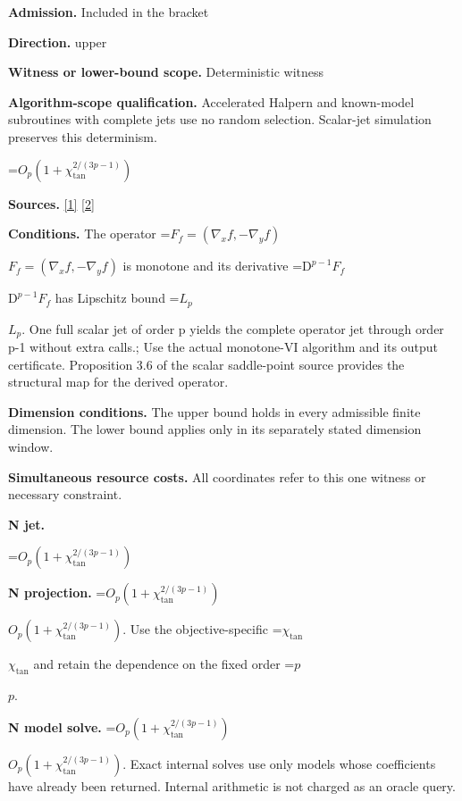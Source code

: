 \documentclass[10pt,a4paper]{article}
\newcommand{\AtlasMath}[1]{\par\begingroup\centering\setbox0=\hbox{$\displaystyle #1$}\ifdim\wd0>1.4\linewidth\typeout{ATLAS WIDE FORMULA: \the\wd0}\fi\ifdim\wd0>\linewidth\resizebox{\linewidth}{!}{\box0}\else\box0\fi\par\endgroup}
\newcommand{\AtlasInlineMath}[1]{\begingroup\setbox0=\hbox{$#1$}\ifdim\wd0>.4\linewidth\endgroup\AtlasMath{#1}\else\endgroup$#1$\fi}
\begin{document}
\textbf{Admission.} Included in the bracket



\textbf{Direction.} upper



\textbf{Witness or lower-bound scope.} Deterministic witness



\textbf{Algorithm-scope qualification.} Accelerated Halpern and known-model subroutines with complete jets use no random selection. Scalar-jet simulation preserves this determinism.



\AtlasMath{O_p(1+\chi_{\mathrm{tan}}^{2/(3p-1)})}


\textbf{Sources.} \href{https://arxiv.org/pdf/2609.23557v1}{[1]} \href{https://arxiv.org/pdf/2609.28246v2}{[2]}



\textbf{Conditions.} The operator \AtlasInlineMath{F_f=(\nabla_xf,-\nabla_yf)} is monotone and its derivative \AtlasInlineMath{\mathrm D^{p-1}F_f} has Lipschitz bound \AtlasInlineMath{L_p}. One full scalar jet of order p yields the complete operator jet through order p-1 without extra calls.; Use the actual monotone-VI algorithm and its output certificate. Proposition 3.6 of the scalar saddle-point source provides the structural map for the derived operator.



\textbf{Dimension conditions.} The upper bound holds in every admissible finite dimension. The lower bound applies only in its separately stated dimension window.



\textbf{Simultaneous resource costs.} All coordinates refer to this one witness or necessary constraint.



\textbf{N jet.}



\AtlasMath{O_p(1+\chi_{\mathrm{tan}}^{2/(3p-1)})}


\textbf{N projection.} \AtlasInlineMath{O_p\!\left(1+\chi_{\mathrm{tan}}^{2/(3p-1)}\right)}. Use the objective-specific \AtlasInlineMath{\chi_{\mathrm{tan}}} and retain the dependence on the fixed order \AtlasInlineMath{p}.



\textbf{N model solve.} \AtlasInlineMath{O_p\!\left(1+\chi_{\mathrm{tan}}^{2/(3p-1)}\right)}. Exact internal solves use only models whose coefficients have already been returned. Internal arithmetic is not charged as an oracle query.
\end{document}
